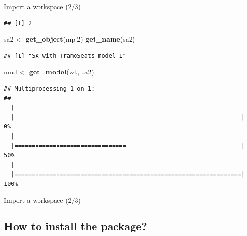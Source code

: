\documentclass[10pt,xcolor=table,color={dvipsnames,usenames},ignorenonframetext,usepdftitle=false,french]{beamer}
\newenvironment{Shaded}{\begin{snugshade}}{\end{snugshade}}
\newcommand{\DecValTok}[1]{\textcolor[rgb]{0.00,0.00,0.81}{#1}}
\newcommand{\KeywordTok}[1]{\textcolor[rgb]{0.13,0.29,0.53}{\textbf{#1}}}
\newcommand{\NormalTok}[1]{#1}
\newcommand{\StringTok}[1]{\textcolor[rgb]{0.31,0.60,0.02}{#1}}
\begin{document}
\begin{frame}[fragile]{Import a workspace (2/3)}
\begin{verbatim}
## [1] 2
\end{verbatim}

\begin{Shaded}
\begin{Highlighting}[]
\NormalTok{sa2 <-}\StringTok{ }\KeywordTok{get_object}\NormalTok{(mp,}\DecValTok{2}\NormalTok{)}
\KeywordTok{get_name}\NormalTok{(sa2)}
\end{Highlighting}
\end{Shaded}

\begin{verbatim}
## [1] "SA with TramoSeats model 1"
\end{verbatim}

\begin{Shaded}
\begin{Highlighting}[]
\NormalTok{mod <-}\StringTok{ }\KeywordTok{get_model}\NormalTok{(wk, sa2)}
\end{Highlighting}
\end{Shaded}

\begin{verbatim}
## Multiprocessing 1 on 1:
## 
  |                                                                       
  |                                                                 |   0%
  |                                                                       
  |================================                                 |  50%
  |                                                                       
  |=================================================================| 100%
\end{verbatim}

\end{frame}

\begin{frame}{Import a workspace (2/3)}
\protect\hypertarget{import-a-workspace-23-1}{}


\end{frame}

\hypertarget{how-to-install-the-package}{%
\subsection{How to install the
package?}\label{how-to-install-the-package}}
\end{document}
